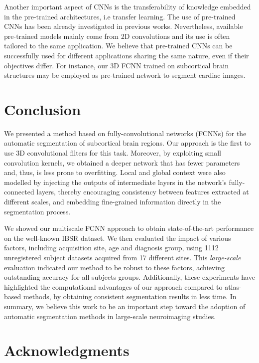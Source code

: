 \documentclass[twoside,fleqn,espcrc2]{elsarticle}
\begin{document}
Another important aspect of CNNs is the transferability of knowledge embedded in the pre-trained architectures, i.e transfer learning. The use of pre-trained CNNs has been already investigated in previous works. Nevertheless, available pre-trained models mainly come from 2D convolutions and its use is often tailored to the same application. We believe that pre-trained CNNs can be successfully used for different applications sharing the same nature, even if their objectives differ. For instance, our 3D FCNN trained on subcortical brain structures may be employed as pre-trained network to segment cardiac images. 

\section{Conclusion}
\label{sec:conclusion}
 
We presented a method based on fully-convolutional networks (FCNNs) for the automatic segmentation of subcortical brain regions. Our approach is the first to use 3D convolutional filters for this task. Moreover, by exploiting small convolution kernels, we obtained a deeper network that has fewer parameters and, thus, is less prone to overfitting. Local and global context were also modelled by injecting the outputs of intermediate layers in the network's fully-connected layers, thereby encouraging consistency between features extracted at different scales, and embedding fine-grained information directly in the segmentation process. 

We showed our multiscale FCNN approach to obtain state-of-the-art performance on the well-known IBSR dataset. We then evaluated the impact of various factors, including acquisition site, age and diagnosis group, using 1112 unregistered subject datasets acquired from 17 different sites. This \emph{large-scale} evaluation indicated our method to be robust to these factors, achieving outstanding accuracy for all subjects groups. Additionally, these experiments have highlighted the computational advantages of our approach compared to atlas-based methods, by obtaining consistent segmentation results in less time. In summary, we believe this work to be an important step toward the adoption of automatic segmentation methods in large-scale neuroimaging studies. 

\section*{Acknowledgments}
\end{document}
